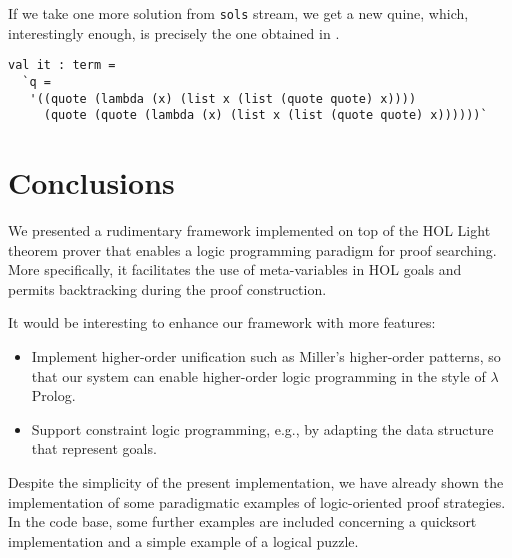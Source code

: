 If we take one more solution from \verb|sols| stream, we get a new
quine, which, interestingly enough, is precisely the one obtained in
\citep{Byrd:2012:MLU:2661103.2661105}.
\begin{verbatim}
val it : term =
  `q =
   '((quote (lambda (x) (list x (list (quote quote) x))))
     (quote (quote (lambda (x) (list x (list (quote quote) x))))))`
\end{verbatim}

\section*{Conclusions}
\label{sec:conclusions}

We presented a rudimentary framework implemented on top of the HOL
Light theorem prover that enables a logic programming paradigm for
proof searching.  More specifically, it facilitates the use of
meta-variables in HOL goals and permits backtracking during the proof
construction.

It would be interesting to enhance our framework with more features:
\begin{itemize}
\item Implement higher-order unification such as Miller's higher-order
  patterns, so that our system can enable higher-order logic
  programming in the style of $\lambda$Prolog.
\item Support constraint logic programming, e.g., by adapting the data
  structure that represent goals.
\end{itemize}

Despite the simplicity of the present implementation, we have already
shown the implementation of some paradigmatic examples of
logic-oriented proof strategies.  In the code base, some further
examples are included concerning a quicksort implementation and a
simple example of a logical puzzle.

